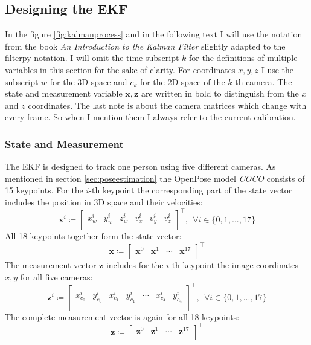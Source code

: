 \subsection{Designing the EKF} 
In the figure \ref{fig:kalmanprocess} and in the following text I will use the notation from the book \textit{An Introduction to the Kalman Filter} \cite{kalmanbook} slightly adapted to the filterpy \cite{filterpybook} notation. I will omit the time subscript $k$ for the definitions of multiple variables in this section for the sake of clarity. For coordinates $x,y,z$ I use the subscript $w$ for the 3D space and $c_k$ for the 2D space of the $k$-th camera. The state and measurement variable $\mathbf{x}, \mathbf{z}$ are written in bold to distinguish from the $x$ and $z$ coordinates. The last note is about the camera matrices which change with every frame. So when I mention them I always refer to the current calibration.

\subsubsection{State and Measurement}
The EKF is designed to track one person using five different cameras. As mentioned in section \ref{sec:poseestimation} the OpenPose model \textit{COCO} consists of 15 keypoints. For the $i$-th keypoint the corresponding part of the state vector includes the position in 3D space and their velocities:
\begin{equation}
\mathbf{x}^i \coloneqq 
\begin{bmatrix}
x^i_{w} & y^i_{w} & z^i_{w} & v^i_{x} & v^i_{y} & v^i_{z}\\
\end{bmatrix}^\intercal,   \ \ \forall i \in \{0,1,...,17\}
\end{equation}
All 18 keypoints together form the state vector:
\begin{equation}
\mathbf{x} \coloneqq 
\begin{bmatrix}
\mathbf{x}^0 & \mathbf{x}^1 & \cdots & \mathbf{x}^{17}\\
\end{bmatrix}^\intercal
\end{equation}
The measurement vector $\mathbf{z}$ includes for the $i$-th keypoint the image coordinates $x, y$ for all five cameras:
\begin{equation}
\mathbf{z}^i \coloneqq 
\begin{bmatrix}
x^i_{c_0} & y^i_{c_0} & x^i_{c_1} & y^i_{c_1} & \cdots & x^i_{c_4} & y^i_{c_4}\\
\end{bmatrix}^\intercal, \ \ \forall i \in \{0,1,...,17\}
\end{equation}
The complete measurement vector is again for all 18 keypoints:
\begin{equation}
\mathbf{z} \coloneqq 
\begin{bmatrix}
\mathbf{z}^0 & \mathbf{z}^1 & \cdots & \mathbf{z}^{17}\\
\end{bmatrix}^\intercal
\end{equation}


